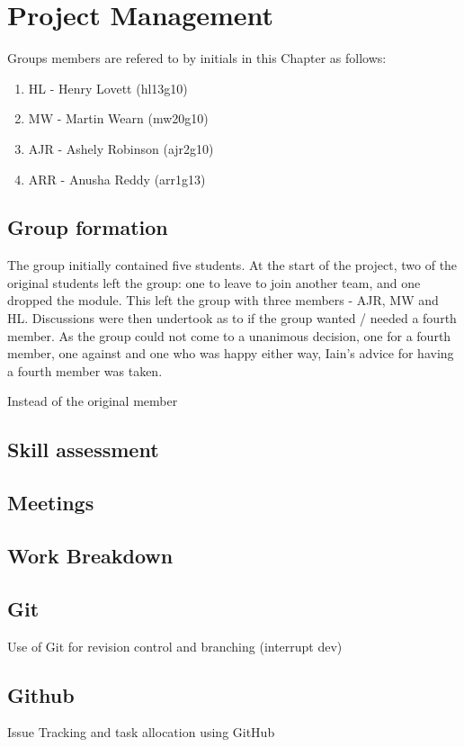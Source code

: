 
\chapter{Project Management}

Groups members are refered to by initials in this Chapter as follows:
\begin{enumerate}
\item HL - Henry Lovett (hl13g10)
\item MW - Martin Wearn (mw20g10)
\item AJR - Ashely Robinson (ajr2g10)
\item ARR - Anusha Reddy (arr1g13)
\end{enumerate}

\section{Group formation}

The group initially contained five students. 
At the start of the project, two of the original students left the group: one to leave to join another team, and one dropped the module.
This left the group with three members - AJR, MW and HL. 
Discussions were then undertook as to if the group wanted / needed a fourth member. 
As the group could not come to a unanimous decision, one for a fourth member, one against and one who was happy either way, Iain's advice for having a fourth member was taken. 

Instead of the original member
\section{Skill assessment}

\section{Meetings}

\section{Work Breakdown}

\section{Git}
Use of Git for revision control and branching (interrupt dev)

\section{Github}
Issue Tracking and task allocation using GitHub

